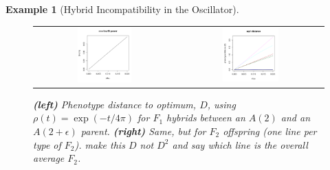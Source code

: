 \documentclass{article}
\newcommand{\plr}[1]{\todo[color=blue!25]{#1}}
\newcommand{\plri}[1]{{\color{blue}\it #1}}
\newcommand{\plr}[1]{{\color{blue}\it #1}}
\newcommand{\plri}[1]{\plr{#1}}
\newcommand{\1}{\mathbbm{1}}
\newtheorem{example}{Example}
\begin{document}
\begin{example}[Hybrid Incompatibility in the Oscillator]
  \begin{figure}[H]
  \label{fig:osc_incompat}
    \centering
    \begin{tabular}{cc}
    \includegraphics[width=0.4\textwidth]{figures/f1_quartic2} &
    \includegraphics[width=0.4\textwidth]{figures/f2_quad2}
    \end{tabular}
    \caption{
    \textbf{(left)} Phenotype distance to optimum, $D$, using $\rho(t) = \exp(-t/4\pi)$
    for $F_1$ hybrids between an $A(2)$ and an $A(2+\epsilon)$ parent.
    \textbf{(right)} Same, but for $F_2$ offspring (one line per type of $F_2$).
    \plri{make this $D$ not $D^2$ and say which line is the overall average $F_2$.}
    } \label{fig:osc_incompat}
  \end{figure}
\end{example}
\end{document}
